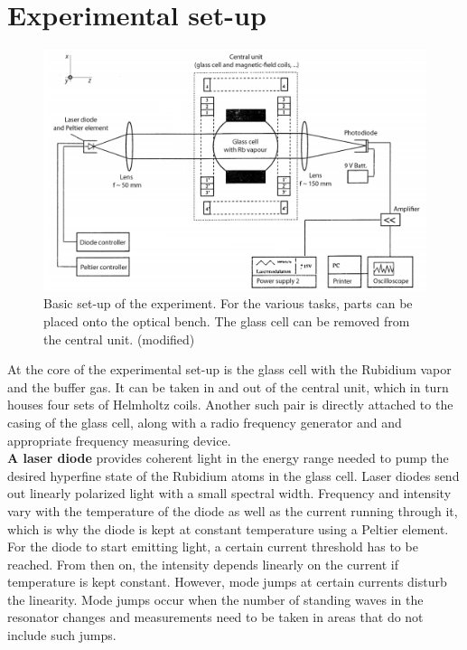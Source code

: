\section{Experimental set-up}
\begin{figure}[h]
\centering
\includegraphics[width=1.0\linewidth]{graphics/generalsetup}
\caption[Basic experimental set-up]{Basic set-up of the experiment. For the various tasks, parts can be placed onto the optical bench. The glass cell can be removed from the central unit. \cite{anleitung} (modified)}
\label{fig:general setup}
\end{figure}
At the core of the experimental set-up is the glass cell with the Rubidium vapor and the buffer gas. It can be taken in and out of the central unit, which in turn houses four sets of Helmholtz coils. Another such pair is directly attached to the casing of the glass cell, along with a radio frequency generator and and appropriate frequency measuring device.\\

\textbf{A laser diode} provides coherent light in the energy range needed to pump the desired hyperfine state of the Rubidium atoms in the glass cell. Laser diodes send out linearly polarized light with a small spectral width. Frequency and intensity vary with the temperature of the diode as well as the current running through it, which is why the diode is kept at constant temperature using a Peltier element. For the diode to start emitting light, a certain current threshold has to be reached. From then on, the intensity depends linearly on the current if temperature is kept constant. However, mode jumps at certain currents disturb the linearity. Mode jumps occur when the number of standing waves in the resonator changes and measurements need to be taken in areas that do not include such jumps.\\

